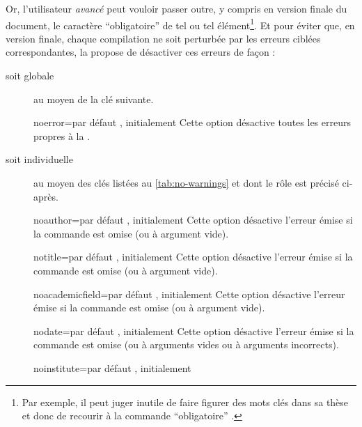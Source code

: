 Or, l'utilisateur \emph{avancé} peut vouloir passer outre, y compris en version
finale du document, le caractère \enquote{obligatoire} de tel ou tel
élément\footnote{Par exemple, il peut juger inutile de faire figurer des mots
  clés dans sa thèse et donc de recourir à la commande \enquote{obligatoire}
  \protect{}.}.  Et pour éviter que, en version finale, chaque
compilation ne soit perturbée par les erreurs ciblées correspondantes, la
\yatcl{} propose de désactiver ces erreurs de façon :
\begin{description}
\item[soit globale] au moyen de la clé  suivante.
  \begin{docKey}{noerror}{=\textbar{}}{par défaut ,
      initialement }
    Cette option désactive toutes les erreurs propres à la \yatcl{}.
  \end{docKey}
\item[soit individuelle] au moyen des clés listées au \vref{tab:no-warnings} et
  dont le rôle est précisé ci-après.
\begin{docKey}{noauthor}{=\textbar{}}{par défaut
    , initialement }
  Cette option désactive l'erreur émise si la commande  est
  omise (ou à argument vide).
\end{docKey}
\begin{docKey}{notitle}{=\textbar{}}{par défaut
    , initialement }
  Cette option désactive l'erreur émise si la commande  est omise
  (ou à argument vide).
\end{docKey}
\begin{docKey}{noacademicfield}{=\textbar{}}{par
    défaut , initialement }
  Cette option désactive l'erreur émise si la commande 
  est omise (ou à argument vide).
\end{docKey}
\begin{docKey}{nodate}{=\textbar{}}{par défaut
    , initialement }
  Cette option désactive l'erreur émise si la commande  est omise
  (ou à arguments vides ou à arguments incorrects).
\end{docKey}
\begin{docKey}{noinstitute}{=\textbar{}}{par
    défaut , initialement }

\end{docKey}
\end{description}
